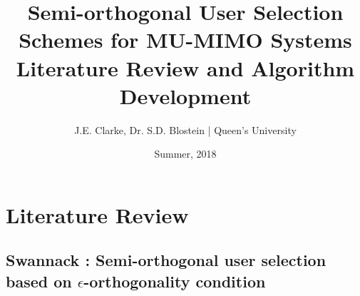 \documentclass[11pt]{article}
\title{Semi-orthogonal User Selection Schemes for MU-MIMO Systems\\ Literature Review and Algorithm Development}
\author{J.E. Clarke, Dr. S.D. Blostein | Queen's University}
\date{Summer, 2018}
\begin{document}
	\maketitle
	\newpage
    \section{Literature Review}
    
        \subsection{Swannack \cite{1549555}: Semi-orthogonal user selection based on $\epsilon$-orthogonality condition}
            
            
    
	
    
    \newpage	
 	\begingroup
 		\renewcommand{\section}[2]{}%
 		
 		
 	\endgroup
\end{document}
